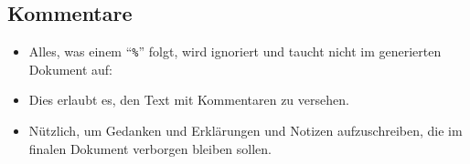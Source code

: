 \subsection{Kommentare}

\begin{frame}[fragile]{\subsecname}
    \begin{itemize}
        \item Alles, was einem \enquote{\texttt{\%}} folgt, wird ignoriert und taucht nicht im
            generierten Dokument auf:
        \item Dies erlaubt es, den Text mit \alert{Kommentaren} zu versehen.
        \item Nützlich, um Gedanken und Erklärungen und Notizen aufzuschreiben, die im finalen
            Dokument verborgen bleiben sollen.
    \end{itemize}
\end{frame}
